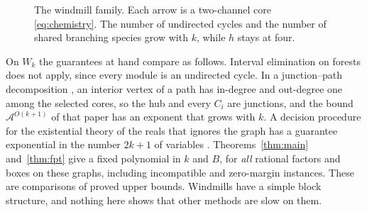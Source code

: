 \documentclass[11pt,a4paper]{article}
\theoremstyle{plain}
\theoremstyle{definition}
\theoremstyle{remark}
\begin{document}
\begin{figure}[!ht]
\centering
{}
\caption{The windmill family. Each arrow is a two-channel core \eqref{eq:chemistry}. The number of undirected cycles and the number of shared branching species grow with $k$, while $h$ stays at four.}
\label{fig:windmill}
\end{figure}

On $W_k$ the guarantees at hand compare as follows. Interval elimination on forests does not apply, since every module is an undirected cycle. In a junction--path decomposition \citep{jp2026}, an interior vertex of a path has in-degree and out-degree one among the selected cores, so the hub and every $C_i$ are junctions, and the bound $\mathcal{A}^{O(k+1)}$ of that paper has an exponent that grows with $k$. A decision procedure for the existential theory of the reals that ignores the graph has a guarantee exponential in the number $2k+1$ of variables \citep{basu2014,renegar1992}. Theorems~\ref{thm:main} and~\ref{thm:fpt} give a fixed polynomial in $k$ and $B$, for \emph{all} rational factors and boxes on these graphs, including incompatible and zero-margin instances. These are comparisons of proved upper bounds. Windmills have a simple block structure, and nothing here shows that other methods are slow on them.
\end{document}
